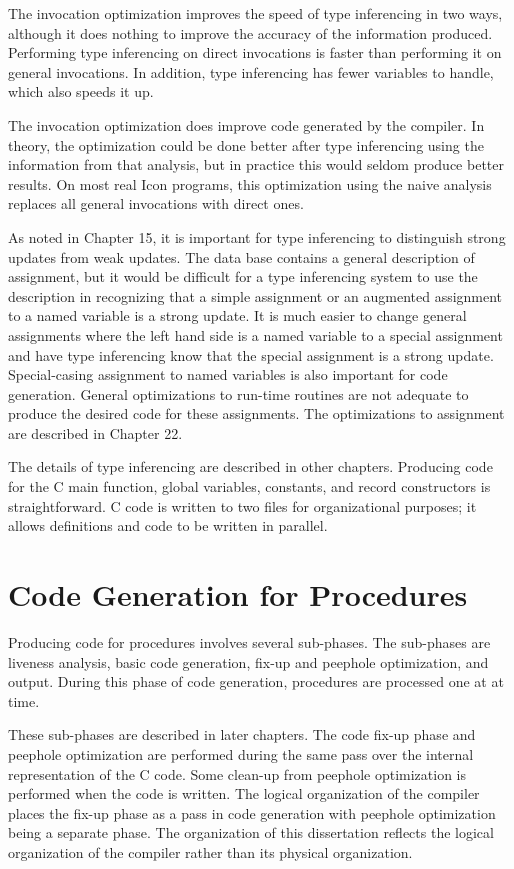 The invocation optimization improves the speed of type inferencing in
two ways, although it does nothing to improve the accuracy of the
information produced. Performing type inferencing on direct
invocations is faster than performing it on general invocations. In
addition, type inferencing has fewer variables to handle, which also
speeds it up.

The invocation optimization does improve code generated by the
compiler. In theory, the optimization could be done better after type
inferencing using the information from that analysis, but in practice
this would seldom produce better results. On most real Icon programs,
this optimization using the naive analysis replaces all general
invocations with direct ones.

As noted in Chapter 15, it is important for type inferencing to
distinguish strong updates from weak updates. The data base contains a
general description of assignment, but it would be difficult for a
type inferencing system to use the description in recognizing that a
simple assignment or an augmented assignment to a named variable is a
strong update.  It is much easier to change general assignments where
the left hand side is a named variable to a special assignment and
have type inferencing know that the special assignment is a strong
update. Special-casing assignment to named variables is also important
for code generation. General optimizations to run-time routines are
not adequate to produce the desired code for these assignments. The
optimizations to assignment are described in Chapter 22.

The details of type inferencing are described in other
chapters. Producing code for the C main function, global variables,
constants, and record constructors is straightforward. C code is
written to two files for organizational purposes; it allows
definitions and code to be written in parallel.


\section{Code Generation for Procedures}

Producing code for procedures involves several sub-phases. The
sub-phases are liveness analysis, basic code generation, fix-up and
peephole optimization, and output. During this phase of code
generation, procedures are processed one at at time.

These sub-phases are described in later chapters. The code fix-up
phase and peephole optimization are performed during the same pass
over the internal representation of the C code. Some clean-up from
peephole optimization is performed when the code is written. The
logical organization of the compiler places the fix-up phase as a pass
in code generation with peephole optimization being a separate
phase. The organization of this dissertation reflects the logical
organization of the compiler rather than its physical organization.

